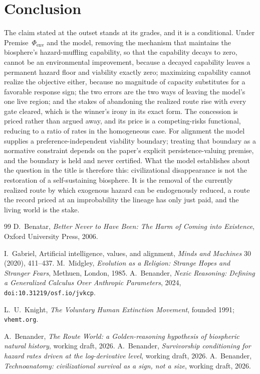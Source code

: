 \documentclass[11pt]{article}
\theoremstyle{plain}
\theoremstyle{definition}
\theoremstyle{remark}
\begin{document}
\section{Conclusion}\label{sec:conclusion}

The claim stated at the outset stands at its grades, and it is a
conditional. Under Premise~$\Phi_{\mathrm{env}}$ and the model, removing
the mechanism that maintains the biosphere's hazard-muffling capability,
so that the capability decays to zero, cannot be an environmental
improvement, because a decayed capability leaves a permanent hazard
floor and viability exactly zero; maximizing capability cannot
realize the objective either, because no magnitude of capacity
substitutes for a favorable response sign; the two errors are the two
ways of leaving the model's one live region; and the stakes of
abandoning the realized route rise with every gate cleared, which is
the winner's irony in its exact form. The concession is priced rather
than argued away, and its price is a competing-risks functional,
reducing to a ratio of rates in the homogeneous case. For alignment the
model supplies a preference-independent viability boundary; treating
that boundary as a normative constraint depends on the paper's explicit
persistence-valuing premise, and the boundary is held and never
certified. What the model
establishes about the question in the title is therefore this:
civilizational disappearance is not the restoration of a
self-sustaining biosphere. It is the removal of the currently realized
route by which exogenous hazard can be endogenously reduced, a route
the record priced at an improbability the lineage has only just paid,
and the living world is the stake.

\begin{thebibliography}{99}\small
{} D.~Benatar, \emph{Better Never to Have Been:
The Harm of Coming into Existence}, Oxford University Press, 2006.

 I.~Gabriel, Artificial intelligence, values, and alignment, \emph{Minds and Machines} 30 (2020), 411--437.
 M.~Midgley, \emph{Evolution as a Religion:
Strange Hopes and Stranger Fears}, Methuen, London, 1985.
 A.~Benander, \emph{Nexic Reasoning: Defining
a Generalized Calculus Over Anthropic Parameters}, 2024,
\texttt{doi:10.31219/osf.io/jvkcp}.

 L.~U.~Knight, \emph{The Voluntary Human
Extinction Movement}, founded 1991; \texttt{vhemt.org}.

 A.~Benander, \emph{The Route World: a Golden-reasoning hypothesis of biospheric natural history}, working draft, 2026.
 A.~Benander, \emph{Survivorship conditioning for hazard rates driven at the log-derivative level}, working draft, 2026.
 A.~Benander, \emph{Technoanatomy: civilizational survival as a sign, not a size}, working draft, 2026.

\end{thebibliography}
\end{document}
